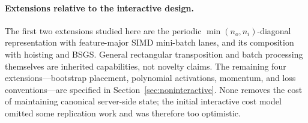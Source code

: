 \paragraph{Extensions relative to the interactive design.}
The first two extensions studied here are the periodic $\min(n_o,n_i)$-diagonal representation with feature-major SIMD mini-batch lanes, and its composition with hoisting and BSGS. General rectangular transposition and batch processing themselves are inherited capabilities, not novelty claims. The remaining four extensions---bootstrap placement, polynomial activations, momentum, and loss conventions---are specified in Section~\ref{sec:noninteractive}. None removes the cost of maintaining canonical server-side state; the initial interactive cost model omitted some replication work and was therefore too optimistic.
